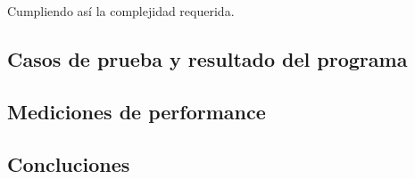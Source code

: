 Cumpliendo as\'i la complejidad requerida.

\subsection{Casos de prueba y resultado del programa} \label{ej_2:casos}

\subsection{Mediciones de performance} \label{ej_2:performance}

\subsection{Concluciones} \label{ej_2:concluciones}

